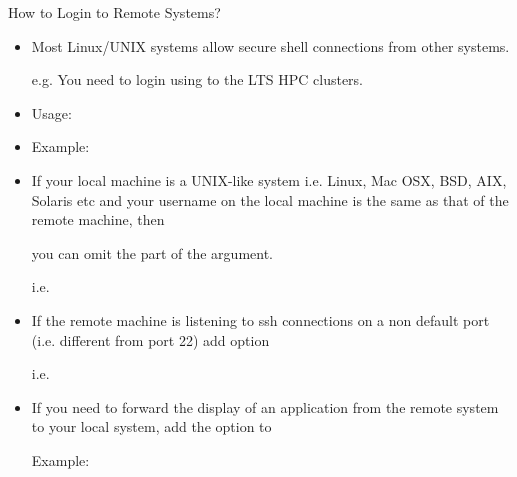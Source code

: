 \documentclass[10pt,t]{beamer}
\begin{document}
\begin{frame}[fragile]{How to Login to Remote Systems?}
  \begin{itemize}
    \item Most Linux/UNIX systems allow secure shell connections from other systems.
    \item[e.g.] You need to login using  to the LTS HPC clusters.
    \item Usage: 
    \item Example: 
    \item If your local machine is a UNIX-like system i.e. Linux, Mac OSX, BSD, AIX, Solaris etc and your username on the local machine is the same as that of the remote machine, then
    \item[] you can omit the  part of the argument.
    \item[] i.e. 
    \item If the remote machine is listening to ssh connections on a non default port (i.e. different from port 22) add  option
    \item[i.e.] 
    \item If you need to forward the display of an application from the remote system to your local system, add the  option to 
    \item[] Example: 
  \end{itemize}
\end{frame}
\end{document}
